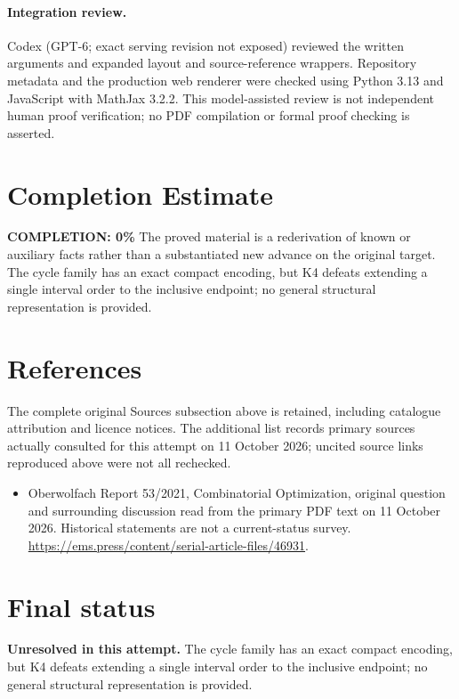 \documentclass[11pt]{article}
\begin{document}
\paragraph{Integration review.} Codex (GPT-6; exact serving revision not exposed) reviewed the written arguments and expanded layout and source-reference wrappers. Repository metadata and the production web renderer were checked using Python 3.13 and JavaScript with MathJax 3.2.2. This model-assisted review is not independent human proof verification; no PDF compilation or formal proof checking is asserted.

\section{Completion Estimate}
\noindent\textbf{COMPLETION: 0\%}
The proved material is a rederivation of known or auxiliary facts rather than a substantiated new advance on the original target. The cycle family has an exact compact encoding, but K4 defeats extending a single interval order to the inclusive endpoint; no general structural representation is provided.
\section{References}
The complete original Sources subsection above is retained, including catalogue attribution and licence notices. The additional list records primary sources actually consulted for this attempt on 11 October 2026; uncited source links reproduced above were not all rechecked.
\begin{itemize}
\item Oberwolfach Report 53/2021, Combinatorial Optimization, original question and surrounding discussion read from the primary PDF text on 11 October 2026. Historical statements are not a current-status survey. \url{https://ems.press/content/serial-article-files/46931}.
\end{itemize}
\section{Final status}
\textbf{Unresolved in this attempt.} The cycle family has an exact compact encoding, but K4 defeats extending a single interval order to the inclusive endpoint; no general structural representation is provided.
\end{document}
